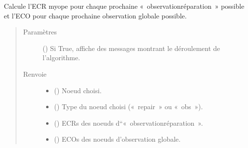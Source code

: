 \documentclass[letterpaper,10pt,french]{sphinxmanual}
\begin{document}
\begin{fulllineitems}
\begin{fulllineitems}
\begin{quote}
\begin{description}
\end{description}\end{quote}

\end{fulllineitems}


\begin{fulllineitems}
\label{\detokenize{index:DecisionTheoreticTroubleshooting.TroubleShootingProblem.ECR_ECO_wrapper}}
Calcule l’ECR myope pour chaque prochaine « observation\sphinxhyphen{}réparation »
possible et l’ECO pour chaque prochaine observation globale possible.
\begin{quote}\begin{description}
\item[{Paramètres}] \leavevmode
{} (\sphinxstyleliteralemphasis{\sphinxupquote{, }}) \textendash{} Si True, affiche des messages montrant le déroulement de
l’algorithme.

\item[{Renvoie}] \leavevmode
\begin{itemize}
\item {} 
 () \textendash{} Noeud choisi.

\item {} 
 () \textendash{} Type du noeud choisi (« repair » ou « obs »).

\item {} 
 () \textendash{} ECRs des noeuds d“« observation\sphinxhyphen{}réparation ».

\item {} 
 () \textendash{} ECOs des noeuds d’observation globale.

\end{itemize}


\end{description}\end{quote}


\end{fulllineitems}
\end{fulllineitems}
\end{document}
